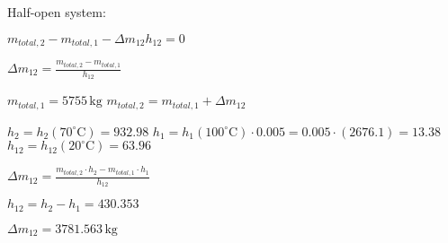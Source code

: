 Half-open system:  

\( m_{total,2} - m_{total,1} - \Delta m_{12} h_{12} = 0 \)  

\( \Delta m_{12} = \frac{m_{total,2} - m_{total,1}}{h_{12}} \)  

\( m_{total,1} = 5755 \, \text{kg} \)  
\( m_{total,2} = m_{total,1} + \Delta m_{12} \)  

\( h_{2} = h_{2}(70^\circ \text{C}) = 932.98 \)  
\( h_{1} = h_{1}(100^\circ \text{C}) \cdot 0.005 = 0.005 \cdot (2676.1) = 13.38 \)  
\( h_{12} = h_{12}(20^\circ \text{C}) = 63.96 \)  

\( \Delta m_{12} = \frac{m_{total,2} \cdot h_{2} - m_{total,1} \cdot h_{1}}{h_{12}} \)  

\( h_{12} = h_{2} - h_{1} = 430.353 \)  

\( \Delta m_{12} = 3781.563 \, \text{kg} \)